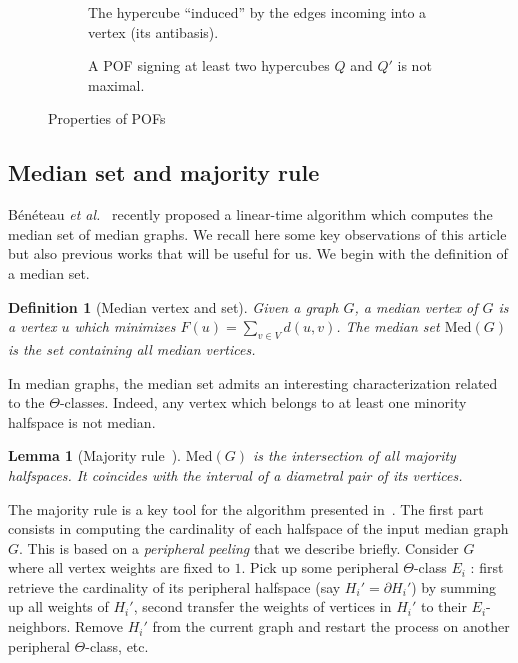 \documentclass[11pt,letterpaper]{article}
\newtheorem{lemma}{Lemma}
\newtheorem{definition}{Definition}
\newcommand{\med}{\mbox{Med}}
\begin{document}
\begin{figure}[h]
\begin{subfigure}[b]{0.49\columnwidth}
\centering
\scalebox{0.8}{}
\caption{The hypercube ``induced'' by the edges incoming into a vertex (its antibasis).}
\label{subfig:ingoing_edges}
\end{subfigure}
\begin{subfigure}[b]{0.49\columnwidth}
\centering
\scalebox{0.8}{}
\caption{A POF signing at least two hypercubes $Q$ and $Q'$ is not maximal.}
\label{subfig:maximal_pof}
\end{subfigure}
\caption{Properties of POFs}
\label{fig:properties_pofs}
\end{figure} 

\subsection{Median set and majority rule}

Bénéteau {\em et al.}~\cite{BeChChVa20} recently proposed a linear-time algorithm which computes the median set of median graphs. We recall here some key observations of this article but also previous works that will be useful for us. We begin with the definition of a median set.

\begin{definition}[Median vertex and set]
Given a graph $G$, a \emph{median vertex} of $G$ is a vertex $u$ which minimizes $F(u) = \sum_{v\in V} d(u,v)$. The median set $\med(G)$ is the set containing all median vertices.
\end{definition}

In median graphs, the median set admits an interesting characterization related to the $\Theta$-classes. Indeed, any vertex which belongs to at least one minority halfspace is not median.

\begin{lemma}[Majority rule~\cite{BaBa84}]
$\med(G)$ is the intersection of all majority halfspaces. It coincides with the interval of a diametral pair of its vertices.
\label{le:majority}
\end{lemma}

The majority rule is a key tool for the algorithm presented in~\cite{BeChChVa20}. The first part consists in computing the cardinality of each halfspace of the input median graph $G$. This is based on a \textit{peripheral peeling} that we describe briefly. Consider $G$ where all vertex weights are fixed to $1$. Pick up some peripheral $\Theta$-class $E_i$ : first retrieve the cardinality of its peripheral halfspace (say $H_i' = \partial H_i'$) by summing up all weights of $H_i'$, second transfer the weights of vertices in $H_i'$ to their $E_i$-neighbors. Remove $H_i'$ from the current graph and restart the process on another peripheral $\Theta$-class, etc.
\end{document}
